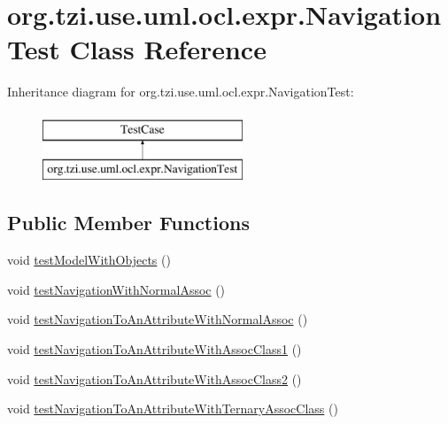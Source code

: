 \hypertarget{classorg_1_1tzi_1_1use_1_1uml_1_1ocl_1_1expr_1_1_navigation_test}{\section{org.\-tzi.\-use.\-uml.\-ocl.\-expr.\-Navigation\-Test Class Reference}
\label{classorg_1_1tzi_1_1use_1_1uml_1_1ocl_1_1expr_1_1_navigation_test}
}
Inheritance diagram for org.\-tzi.\-use.\-uml.\-ocl.\-expr.\-Navigation\-Test\-:\begin{figure}[H]
\begin{center}
\leavevmode
\includegraphics[height=2.000000cm]{classorg_1_1tzi_1_1use_1_1uml_1_1ocl_1_1expr_1_1_navigation_test}
\end{center}
\end{figure}
\subsection*{Public Member Functions}
\begin{DoxyCompactItemize}
\item 
void \hyperlink{classorg_1_1tzi_1_1use_1_1uml_1_1ocl_1_1expr_1_1_navigation_test_ade4148fbc0c4b9bac00e69d9ce7f8a7a}{test\-Model\-With\-Objects} ()
\item 
void \hyperlink{classorg_1_1tzi_1_1use_1_1uml_1_1ocl_1_1expr_1_1_navigation_test_a333e28a2ef6d644e6c0018641fc4ab31}{test\-Navigation\-With\-Normal\-Assoc} ()
\item 
void \hyperlink{classorg_1_1tzi_1_1use_1_1uml_1_1ocl_1_1expr_1_1_navigation_test_ae09b179c71f393b16b20f587129e6eef}{test\-Navigation\-To\-An\-Attribute\-With\-Normal\-Assoc} ()
\item 
void \hyperlink{classorg_1_1tzi_1_1use_1_1uml_1_1ocl_1_1expr_1_1_navigation_test_af16763bc1b2402e522161b08af947e4a}{test\-Navigation\-To\-An\-Attribute\-With\-Assoc\-Class1} ()
\item 
void \hyperlink{classorg_1_1tzi_1_1use_1_1uml_1_1ocl_1_1expr_1_1_navigation_test_a1d6d01d32e42042f65777cbacd0e3125}{test\-Navigation\-To\-An\-Attribute\-With\-Assoc\-Class2} ()
\item 
void \hyperlink{classorg_1_1tzi_1_1use_1_1uml_1_1ocl_1_1expr_1_1_navigation_test_a83ae396ba639cea9bd609ab7ee725c70}{test\-Navigation\-To\-An\-Attribute\-With\-Ternary\-Assoc\-Class} ()
\end{DoxyCompactItemize}
